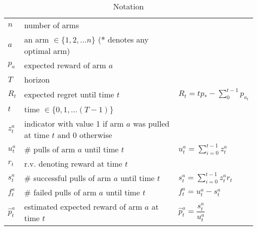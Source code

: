 \begin{table}
\centering
\caption*{Notation}
\begin{tabular}{lll}
    $n$ & number of arms & \\
    $a$ & an arm $\in\{1,2,\ldots n\}$ ($*$ denotes any optimal arm) & \\
    $p_a$ & expected reward of arm $a$ & \\
    $T$ & horizon & \\
    $R_t$ & expected regret until time $t$ & $R_t = tp_* - \sum\limits_0^{t - 1} p_{a_t}$ \\
    $t$ & time $\in\{0,1,\ldots (T-1)\}$ & \\
    $z_t^a$ & indicator with value 1 if arm $a$ was pulled at time $t$ and 0 otherwise & \\
    $u_t^a$ & \# pulls of arm $a$ until time $t$ & $u_t^a = \sum\limits_{i=0}^{t-1}z_t^a$ \\
    $r_t$ & r.v. denoting reward at time $t$ & \\
    $s_t^a$ & \# successful pulls of arm $a$ until time $t$ & $s_t^a = \sum\limits_{i=0}^{t-1}z_t^ar_t$ \\
    $f_t^a$ & \# failed pulls of arm $a$ until time $t$ & $f_t^a = u_t^a - s_t^a$ \\
    $\hat{p}_t^a$ & estimated expected reward of arm $a$ at time $t$ & $\hat{p}_t^a = \dfrac{s_t^a}{u_t^a}$
\end{tabular}
\end{table}
